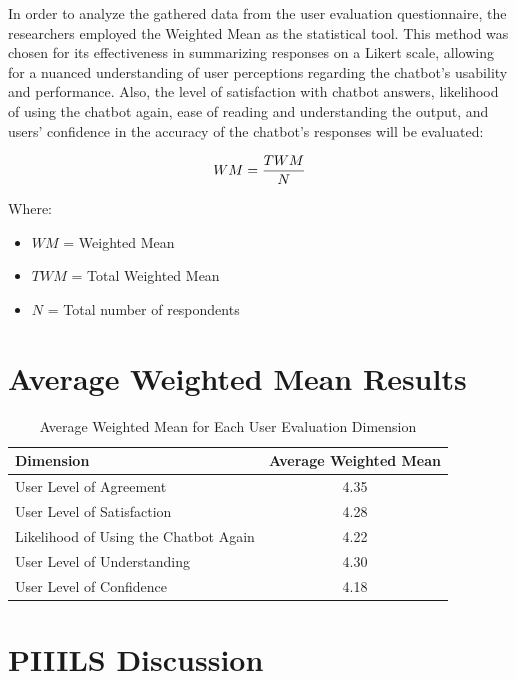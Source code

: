 \begin{refsection}
In order to analyze the gathered data from the user evaluation questionnaire, the researchers employed the Weighted Mean as the statistical tool. This method was chosen for its effectiveness in summarizing responses on a Likert scale, allowing for a nuanced understanding of user perceptions regarding the chatbot's usability and performance. Also, the level of satisfaction with chatbot answers, likelihood of using the chatbot again, ease of reading and understanding the output, and users’ confidence in the accuracy of the chatbot’s responses will be evaluated:

\begin{equation}
    \centering
    WM = \frac{TWM}{N}
\end{equation}

Where:
\begin{itemize}
    \item $WM$ = Weighted Mean
    \item $TWM$ = Total Weighted Mean
    \item $N$ = Total number of respondents
\end{itemize}

\section*{Average Weighted Mean Results}

\begin{table}[H]
    \centering
    \caption{Average Weighted Mean for Each User Evaluation Dimension}
    \label{tab:average_weighted_mean}
    \footnotesize
    \begin{tabular}{lc}
        \hline
        \textbf{Dimension} & \textbf{Average Weighted Mean} \\
        \hline
        User Level of Agreement           & 4.35 \\
        User Level of Satisfaction        & 4.28 \\
        Likelihood of Using the Chatbot Again & 4.22 \\
        User Level of Understanding       & 4.30 \\
        User Level of Confidence          & 4.18 \\
        \hline
    \end{tabular}
\end{table}

\section*{PIIILS Discussion}


\end{refsection}
